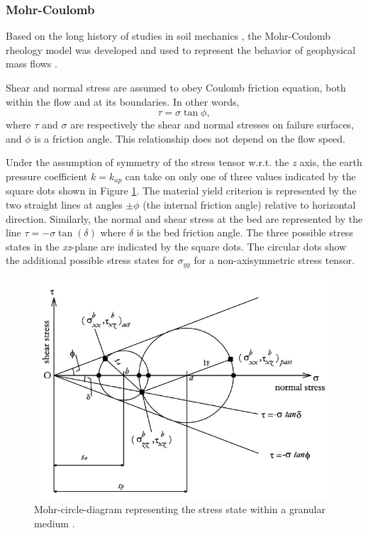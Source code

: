 \documentclass{article}
\begin{document}
\subsubsection{Mohr-Coulomb}\label{MCM}
Based on the long history of studies in soil mechanics \citep{Rankine1857}, the Mohr-Coulomb rheology model was developed and used to represent the behavior of geophysical mass flows \cite{SavageHutter1989}.

Shear and normal stress are assumed to obey Coulomb friction equation, both within the flow and at its boundaries. In other words,
\begin{equation}
\tau = \sigma \tan \phi,
\end{equation}
where $\tau$ and $\sigma$ are respectively the shear and normal stresses on failure surfaces, and $\phi$ is a friction angle. This relationship does not depend on the flow speed.

Under the assumption of symmetry of the stress tensor w.r.t. the \textit{z} axis, the earth pressure coefficient $k=k_{ap}$ can take on only one of three values indicated by the square dots shown in Figure \ref{mohr_circle}. The material yield criterion is represented by the two straight lines at angles $\pm \phi$ (the internal friction angle) relative to horizontal direction. Similarly, the normal and shear stress at the bed are represented by the line $\tau=-\sigma \tan(\delta)$ where $\delta$ is the bed friction angle. The three possible stress states in the \textit{xz}-plane are indicated by the square dots. The circular dots show the additional possible stress states for $\sigma_{yy}$ for a non-axisymmetric stress tensor.

\begin{figure}[H]
        \centering
        \includegraphics[width=.7\textwidth]{Figures/mohr.jpg}
        \caption{Mohr-circle-diagram representing the stress state within a granular medium \citep{Pirulli2007}.}
        \label{mohr_circle}
\end{figure}
\end{document}
